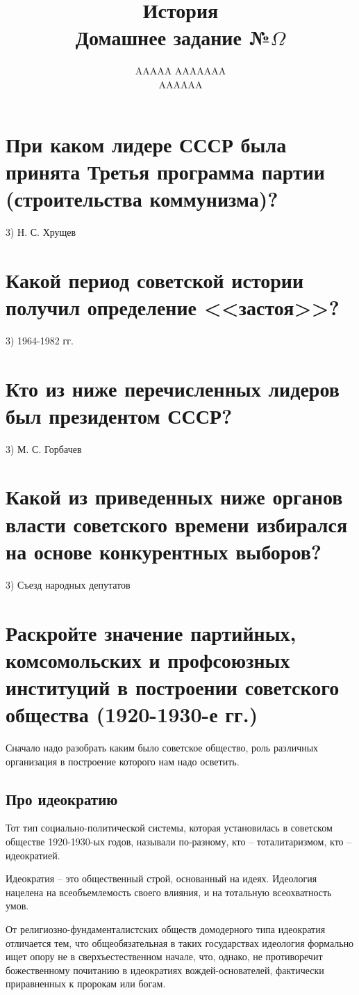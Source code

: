 \documentclass[12pt]{article}
\title{История \\ Домашнее задание №$\Omega$}
\author{AAAAA AAAAAAA \\ AAAAAA}
\begin{document}
  \maketitle

  \section{При каком лидере СССР была принята Третья программа партии (строительства коммунизма)?}
  3) Н. С. Хрущев

  \section{Какой период советской истории получил определение <<застоя>>?}
  3) 1964-1982 гг.

  \section{Кто из ниже перечисленных лидеров был президентом СССР?}
  3) М. С. Горбачев

  \section{Какой из приведенных ниже органов власти советского времени избирался на основе конкурентных выборов?}
  3) Съезд народных депутатов

  \newpage
  \section{Раскройте значение партийных, комсомольских и профсоюзных институций в построении советского общества (1920-1930-е гг.)}
  Сначало надо разобрать каким было советское общество, роль различных организация в построение которого нам надо осветить.

  \subsection{Про идеократию}
  Тот тип социально-политической системы, которая установилась в советском обществе 1920-1930-ых годов,
  называли по-разному, кто -- тоталитаризмом, кто -- идеократией.

  Идеократия -- это общественный строй, основанный на идеях.
  Идеология нацелена на всеобъемлемость своего влияния, и на тотальную всеохватность умов.

  От религиозно-фундаменталистских обществ домодерного типа идеократия отличается тем,
  что общеобязательная в таких государствах идеология формально ищет опору не в сверхъестественном начале,
  что, однако, не противоречит божественному почитанию в идеократиях вождей-основателей, фактически приравненных к пророкам или богам.
\end{document}
